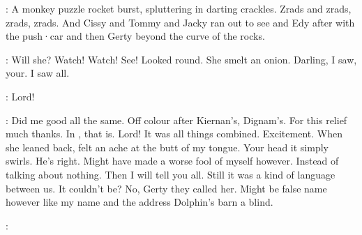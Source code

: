 :
A monkey puzzle rocket burst,
spluttering in darting crackles.
Zrads and zrads,
zrads,
zrads.
And Cissy and Tommy and Jacky ran out to see
and Edy after with the push·car
and then Gerty
beyond the curve of the rocks.

\Bloom:
Will she?
Watch!
Watch!
See!
Looked round.
She smelt an onion.
Darling,
I saw,
your.
I saw all.

\Bloom:
Lord!

\Bloom:
Did me good
all the same.
Off colour after Kiernan's,
Dignam's.
For this relief
much thanks.
In ,
that is.
Lord!
It was all things combined.
Excitement.
When she leaned back,
felt an ache at the butt of my tongue.
Your head
it simply swirls.
He's right.
Might have made a worse fool of myself
however.
Instead of talking about nothing.
Then I will tell you all.
Still it was a kind of language between us.
It couldn't be?
No,
Gerty
they called her.
Might be false name however
like my name
and the address
Dolphin's barn a blind.

:

